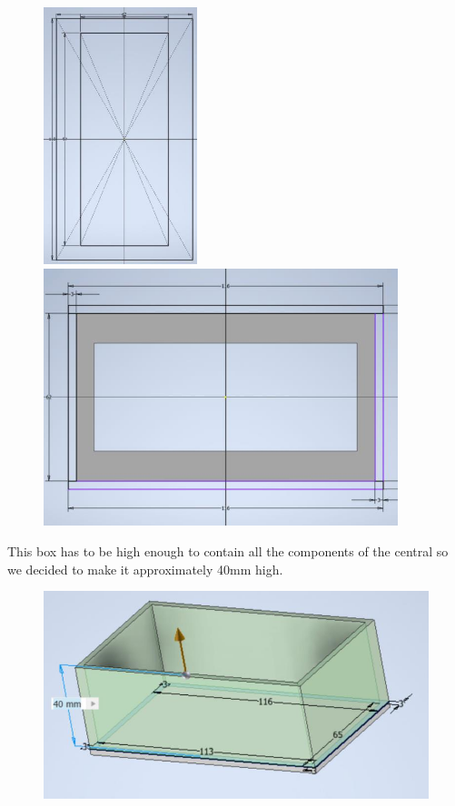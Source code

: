 \begin{figure}[H]
    \includegraphics[height=7.5cm]{images/casing/img17.jpg}
    \hfill
    \includegraphics[height=7.5cm]{images/casing/img18.jpg}
\end{figure}

This box has to be high enough to contain all the components of the central so we decided to make it approximately 40mm high.
\begin{figure}[H]
    \centering
    \includegraphics[width=.7\textwidth]{images/casing/img21.jpg}
\end{figure}

